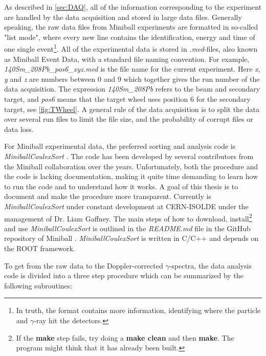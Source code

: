 \documentclass[twoside,english]{uiofysmaster/uiofysmaster}
\newcommand{\ga}{$\gamma$}
\let\orgautoref\autoref
\renewcommand{\autoref}
        {%
		 \def\sectionautorefname{Section}%
		 \def\subsectionautorefname{Section}%
		 \def\subsubsectionautorefname{Section}%
		 \def\chapterautorefname{Chapter}%
          \orgautoref}
\begin{document}
As described in \autoref{sec:DAQ}, all of the information corresponding to the experiment are handled by the data acquisition and stored in large data files. 
Generally speaking, the raw data files from Miniball experiments are formatted in so-called "list mode", where every new line contains the identification, energy and time of one single event\footnote{In truth, the format contains more information, identifying where the particle and \ga-ray hit the detectors.}.
All of the experimental data is stored in \textit{.med}-files, also known as Miniball Event Data, with a standard file naming convention. 
For example, \textit{140Sm\_208Pb\_pos6\_xyz.med} is the file name for the current experiment. 
Here \textit{x}, \textit{y} and \textit{z} are numbers between 0 and 9 which together gives the run number of the data acquisition. 
The expression \textit{140Sm\_208Pb} refers to the beam and secondary target, and \textit{pos6} means that the target wheel uses position 6 for the secondary target, see \autoref{fig:TWheel}.
A general rule of the data acquisition is to split the data over several run files to limit the file size, and the probability of corrupt files or data loss.

For Miniball experimental data, the preferred sorting and analysis code is \textsl{MiniballCoulexSort} \cite{MBCS}.
The code has been developed by several contributors from the Miniball collaboration over the years. 
Unfortunately, both the procedure and the code is lacking documentation, making it quite time demanding to learn how to run the code and to understand how it works.
A goal of this thesis is to document and make the procedure more transparent.
Currently is \textsl{MiniballCoulexSort} under constant development at CERN-ISOLDE under the management of Dr. Liam Gaffney. 
The main steps of how to download, install\footnote{If the \textbf{make} step fails, try doing a \textbf{make clean} and then \textbf{make}. The program might think that it has already been built.} and use \textsl{MiniballCoulexSort} is outlined in the \textit{README.md} file in the GitHub repository of Miniball \cite{MBCS}. 
\textsl{MiniballCoulexSort} is written in C/C++ and depends on the ROOT framework. 

To get from the raw data to the Doppler-corrected \ga-spectra, the data analysis code is divided into a three step procedure which can be summarized by the following subroutines:
\end{document}
